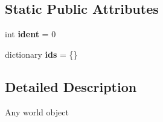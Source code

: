 \subsection*{\-Static \-Public \-Attributes}
\begin{DoxyCompactItemize}
\item 
\hypertarget{classworld_1_1_base_object_a7acd9fa2bf98782cd7c9a1c7f7aea236}{int {\bfseries ident} = 0}\label{classworld_1_1_base_object_a7acd9fa2bf98782cd7c9a1c7f7aea236}

\item 
\hypertarget{classworld_1_1_base_object_a66c7c1d2d9232b87ad05418353d00e5e}{dictionary {\bfseries ids} = \{\}}\label{classworld_1_1_base_object_a66c7c1d2d9232b87ad05418353d00e5e}

\end{DoxyCompactItemize}


\subsection{\-Detailed \-Description}
\begin{DoxyVerb}Any world object \end{DoxyVerb}
 

